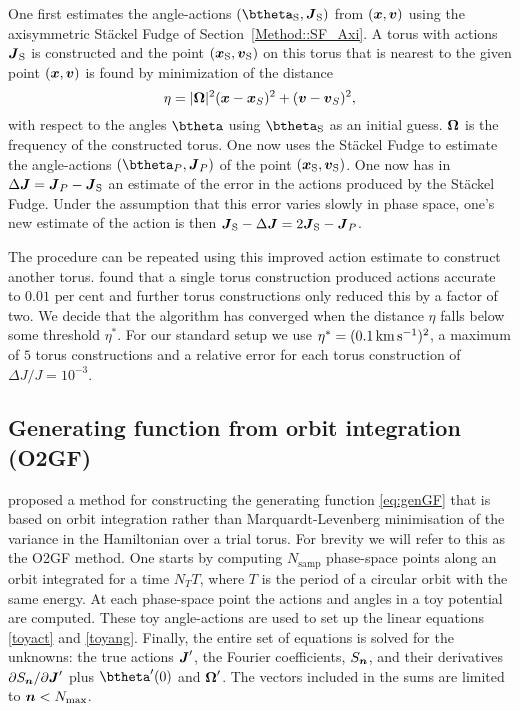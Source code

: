 \documentclass[useAMS,usenatbib,fleqn,a4paper]{mn2e}
\def\kms{\,{\rm km\,s^{-1}}}
\def\percent{\text{ per cent}}
\newcommand{\bs}[1]{\bmath{#1}}
\def\percent{\text{ per cent}}
\begin{document}
One first estimates the angle-actions $(\btheta_{\rm S},\boldsymbol{J}_{\rm S})$ from
$(\bs{x},\bs{v})$ using the axisymmetric St\"ackel Fudge of
Section~\ref{Method::SF_Axi}. A torus with actions $\boldsymbol{J}_{\rm S}$ is
constructed and the point $(\bs{x}_{\rm S},\bs{v}_{\rm S})$ on this torus that is nearest to the
given point $(\bs{x},\bs{v})$ is found by minimization of the distance
\[
\eta=|\bs{\Omega}|^2(\bs{x}-\bs{x}_S)^2+(\bs{v}-\bs{v}_S)^2,
\]
with respect to the angles $\btheta$ using $\btheta_{\rm S}$ as an initial guess. $\bs{\Omega}$ is the frequency of the constructed torus. One now uses the
St\"ackel Fudge to estimate the angle-actions $(\btheta_P,\boldsymbol{J}_P)$
of the point $(\bs{x}_{\rm S},\bs{v}_{\rm S})$. One now has in
$\Delta\bs{J}=\bs{J}_P-\bs{J}_{\rm S}$ an estimate of the error in the actions
produced by the St\"ackel Fudge.  Under the
assumption that this error varies slowly in phase space, one's new estimate
of the action is then
$\boldsymbol{J}_{\rm S}-\Delta\boldsymbol{J}=2\boldsymbol{J}_{\rm S}-\boldsymbol{J}_P$.

The procedure can be repeated using this improved action estimate to
construct another torus. \cite{SandersBinney2015} found that a single torus
construction produced actions accurate to $0.01\percent$ and further torus
constructions only reduced this by a factor of two. We decide that the algorithm has converged when the distance $\eta$ falls below some threshold $\eta^*$. For our standard setup we
use $\eta^*=(0.1\kms)^2$, a maximum of $5$ torus constructions and a relative
error for each torus construction of $\Delta J/J=10^{-3}$.

\subsection{Generating function from orbit integration (O2GF)}\label{Method::Genfunc}

\cite{SandersBinney2014} proposed a method for constructing the generating
function \eqref{eq:genGF} that is based on orbit integration rather than
Marquardt-Levenberg minimisation of the variance in the Hamiltonian over a
trial torus. For brevity we will refer to this as the O2GF method. One starts
by computing $N_\mathrm{samp}$ phase-space points along an orbit integrated
for a time $N_T T$, where $T$ is the period of a circular orbit with the same
energy. At each phase-space point the actions and angles in a toy potential
are computed. These toy angle-actions are used to set up the linear equations
\eqref{toyact} and \eqref{toyang}. Finally, the entire set of equations is
solved for the unknowns: the true actions $\bs{J}'$, the Fourier
coefficients, $S_{\bs{n}}$, and their derivatives $\partial
S_{\bs{n}}/\partial\bs{J}'$ plus $\btheta'(0)$ and $\bs{\Omega}'$. The
vectors included in the sums are limited to $\bs{n}<N_\mathrm{max}$.
\end{document}
